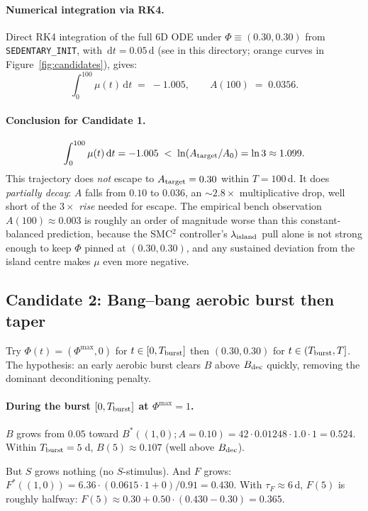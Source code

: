 \documentclass[11pt,a4paper]{article}
\theoremstyle{definition}
\newcommand{\dd}{\,\mathrm{d}}
\begin{document}
\paragraph{Numerical integration via RK4.}
Direct RK4 integration of the full 6D ODE under $\Phi \equiv (0.30, 0.30)$ from \texttt{SEDENTARY\_INIT}, with $\dd t = 0.05$\,d (see  in this directory; orange curves in Figure~\ref{fig:candidates}), gives:
\[
\int_0^{100} \mu(t)\dd t \;=\; -1.005,
\qquad A(100) \;=\; 0.0356.
\]

\paragraph{Conclusion for Candidate 1.}
\[
\int_0^{100} \mu(t)\dd t = -1.005 \;<\; \ln(A_{\rm target}/A_0) = \ln 3 \approx 1.099.
\]
This trajectory does \emph{not} escape to $A_{\rm target} = 0.30$ within $T = 100$\,d. It does \emph{partially decay}: $A$ falls from $0.10$ to $0.036$, an $\sim 2.8\!\times$ multiplicative drop, well short of the $3\!\times$ \emph{rise} needed for escape. The empirical bench observation $A(100) \approx 0.003$ is roughly an order of magnitude worse than this constant-balanced prediction, because the SMC$^2$ controller's $\lambda_{\rm island}$ pull alone is not strong enough to keep $\Phi$ pinned at $(0.30, 0.30)$, and any sustained deviation from the island centre makes $\mu$ even more negative.

\subsection{Candidate 2: Bang--bang aerobic burst then taper}

Try $\Phi(t) = (\Phi^{\max}, 0)$ for $t \in [0, T_{\rm burst}]$ then $(0.30, 0.30)$ for $t \in (T_{\rm burst}, T]$. The hypothesis: an early aerobic burst clears $B$ above $B_{\rm dec}$ quickly, removing the dominant deconditioning penalty.

\paragraph{During the burst $[0, T_{\rm burst}]$ at $\Phi^{\max} = 1$.}
$B$ grows from $0.05$ toward $B^*((1, 0); A=0.10) = 42 \cdot 0.01248 \cdot 1.0 \cdot 1 = 0.524$. Within $T_{\rm burst} = 5$\,d, $B(5) \approx 0.107$ (well above $B_{\rm dec}$).

But $S$ grows nothing (no $S$-stimulus). And $F$ grows: $F^*((1, 0)) = 6.36 \cdot (0.0615 \cdot 1 + 0)/0.91 = 0.430$. With $\tau_F \approx 6$\,d, $F(5)$ is roughly halfway: $F(5) \approx 0.30 + 0.50 \cdot (0.430 - 0.30) = 0.365$.
\end{document}

